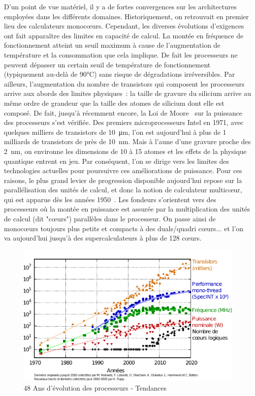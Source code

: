 \documentclass[french, a4paper, 11pt, twoside, pdftex]{StyleThese}
\begin{document}
		D'un point de vue matériel, il y a de fortes convergences sur les architectures employées dans les différents domaines. Historiquement, on retrouvait en premier lieu des calculateurs monocœurs. Cependant, les diverses évolutions d'exigences ont fait apparaître des limites en capacité de calcul. La montée en fréquence de fonctionnement atteint un seuil maximum à cause de l'augmentation de température et la consommation que cela implique. De fait les processeurs ne peuvent dépasser un certain seuil de température de fonctionnement (typiquement au-delà de 90°C) sans risque de dégradations irréversibles. Par ailleurs, l'augmentation du nombre de transistors qui composent les processeurs arrive aux abords des limites physiques~: la taille de gravure du silicium arrive au même ordre de grandeur que la taille des atomes de silicium dont elle est composé. De fait, jusqu'à récemment encore, la Loi de Moore~\cite{thompson_moores_2006} sur la puissance des processeurs s'est vérifiée. Des premiers microprocesseurs Intel en 1971, avec quelques milliers de transistors de \SI{10}{\micro\metre}, l'on est aujourd'hui à plus de 1 milliards de transistors de près de \SI{10}{\nano\metre}. Mais à l'aune d'une gravure proche des \SI{2}{\nano\metre}, on environne les dimensions de 10 à 15 atomes et les effets de la physique quantique entrent en jeu. Par conséquent, l'on se dirige vers les limites des technologies actuelles pour poursuivre ces améliorations de puissance. Pour ces raisons, le plus grand levier de progression disponible aujourd'hui repose sur la parallélisation des unités de calcul, et donc la notion de calculateur multicœur, qui est apparue dès les années 1950~\cite{smotherman_history_2005}. Les fondeurs s'orientent vers des processeurs où la montée en puissance est assurée par la multiplication des unités de calcul (dit "cœurs") parallèles dans le processeur. On passe ainsi de monocœurs toujours plus petits et compacts à des duals/quadri cœurs... et l'on va aujourd'hui jusqu'à des supercalculateurs à plus de 128 cœurs. 
		
		\begin{figure}[ht!]
			\centering
			\includegraphics[width=0.8\linewidth]{graphiques/processors_trend}
			\caption[Évolution des processeurs]{48 Ans d'évolution des processeurs - Tendances}
			\label{fig:processorstrend}
		\end{figure}
	
\end{document}
